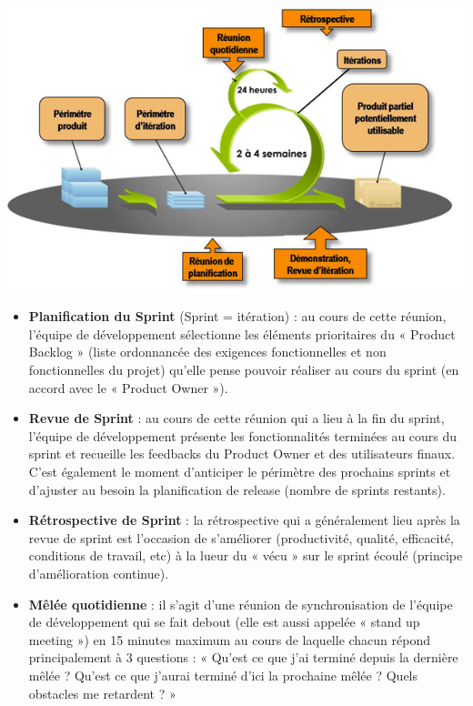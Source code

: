 \documentclass[a4paper,11pt,french]{article}
\begin{document}
\includegraphics[width=40em]{scrum-agiles.jpg}


\newpage

\begin{itemize}
\item \textbf{Planification du Sprint} (Sprint = itération) : au cours de cette réunion, l’équipe de développement sélectionne les éléments prioritaires du « Product Backlog » (liste ordonnancée des exigences fonctionnelles et non fonctionnelles du projet) qu’elle pense pouvoir réaliser au cours du sprint (en accord avec le « Product Owner »).
\item \textbf{Revue de Sprint} : au cours de cette réunion qui a lieu à la fin du sprint, l’équipe de développement présente les fonctionnalités terminées au cours du sprint et recueille les feedbacks du Product Owner et des utilisateurs finaux. C’est également le moment d’anticiper le périmètre des prochains sprints et d’ajuster au besoin la planification de release (nombre de sprints restants).
\item \textbf{Rétrospective de Sprint} : la rétrospective qui a généralement lieu après la revue de sprint est l’occasion de s’améliorer (productivité, qualité, efficacité, conditions de travail, etc) à la lueur du « vécu » sur le sprint écoulé (principe d’amélioration continue).
\item \textbf{Mêlée quotidienne} : il s’agit d’une réunion de synchronisation de l’équipe de développement qui se fait debout (elle est aussi appelée « stand up meeting ») en 15 minutes maximum au cours de laquelle chacun répond principalement à 3 questions : « Qu’est ce que j’ai terminé depuis la dernière mêlée ? Qu’est ce que j’aurai terminé d’ici la prochaine mêlée ? Quels obstacles me retardent ? »
\end{itemize}
\end{document}
